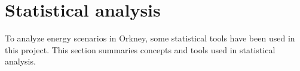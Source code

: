 \documentclass[12pt,a4paper]{report}
\begin{document}
        \section{Statistical analysis}
        To analyze energy scenarios in Orkney, some statistical tools have been used in this project.
        This section summaries concepts and tools used in statistical analysis.
        


        
\end{document}
